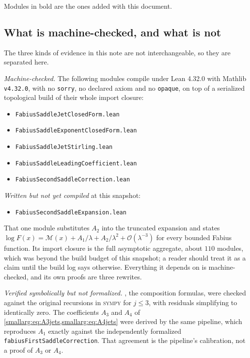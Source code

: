 \documentclass[11pt,oneside]{article}
\theoremstyle{definition}
\theoremstyle{remark}
\newcommand{\bigO}{\mathcal O}
\begin{document}
Modules in bold are the ones added with this document.

\subsection{What is machine-checked, and what is not}

The three kinds of evidence in this note are not interchangeable, so they
are separated here.

\emph{Machine-checked.}  The following modules compile under Lean 4.32.0
with Mathlib \texttt{v4.32.0}, with no \texttt{sorry}, no declared axiom and
no \texttt{opaque}, on top of a serialized topological build of their whole
import closure:
\begin{itemize}
\item \texttt{FabiusSaddleJetClosedForm.lean}
\item \texttt{FabiusSaddleExponentClosedForm.lean}
\item \texttt{FabiusSaddleJetStirling.lean}
\item \texttt{FabiusSaddleLeadingCoefficient.lean}
\item \texttt{FabiusSecondSaddleCorrection.lean}
\end{itemize}

\emph{Written but not yet compiled} at this snapshot:
\begin{itemize}
\item \texttt{FabiusSecondSaddleExpansion.lean}
\end{itemize}
That one module substitutes $A_2$ into the truncated expansion and states
$\log F(x)=\mathcal M(x)+A_1/\lambda+A_2/\lambda^2+\bigO(\lambda^{-3})$ for
every bounded Fabius function.  Its import closure is the full asymptotic
aggregate, about $110$ modules, which was beyond the build budget of this
snapshot; a reader should treat it as a claim until the build log says
otherwise.  Everything it depends on is machine-checked, and its own proofs
are three rewrites.

\emph{Verified symbolically but not formalized.}  ,
the composition formulas, were checked against the original recursions in
\textsc{sympy} for $j\le3$, with residuals simplifying to identically zero.
The coefficients $A_3$ and $A_4$ of \cref{smallarg:eq:A3jets,smallarg:eq:A4jets} were derived
by the same pipeline, which reproduces $A_1$ exactly against the
independently formalized \texttt{fabiusFirstSaddleCorrection}.  That
agreement is the pipeline's calibration, not a proof of $A_3$ or $A_4$.
\end{document}
